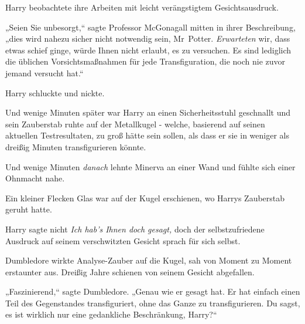 Harry beobachtete ihre Arbeiten mit leicht verängstigtem Gesichtsausdruck.

„Seien Sie unbesorgt,“ sagte Professor McGonagall mitten in ihrer Beschreibung, „dies wird nahezu sicher nicht notwendig sein, Mr~Potter. \emph{Erwarteten} wir, dass etwas schief ginge, würde Ihnen nicht erlaubt, es zu versuchen. Es sind lediglich die üblichen Vorsichtsmaßnahmen für jede Transfiguration, die noch nie zuvor jemand versucht hat.“

Harry schluckte und nickte.

Und wenige Minuten später war Harry an einen Sicherheitsstuhl geschnallt und sein Zauberstab ruhte auf der Metallkugel - welche, basierend auf seinen aktuellen Testresultaten, zu groß hätte sein sollen, als dass er sie in weniger als dreißig Minuten transfigurieren könnte.

Und wenige Minuten \emph{danach} lehnte Minerva an einer Wand und fühlte sich einer Ohnmacht nahe.

Ein kleiner Flecken Glas war auf der Kugel erschienen, wo Harrys Zauberstab geruht hatte.

Harry sagte nicht \emph{Ich hab's Ihnen doch gesagt,} doch der selbstzufriedene Ausdruck auf seinem verschwitzten Gesicht sprach für sich selbst.

Dumbledore wirkte Analyse-Zauber auf die Kugel, sah von Moment zu Moment erstaunter aus. Dreißig Jahre schienen von seinem Gesicht abgefallen.

„Faszinierend,“ sagte Dumbledore. „Genau wie er gesagt hat. Er hat einfach einen Teil des Gegenstandes transfiguriert, ohne das Ganze zu transfigurieren. Du sagst, es ist wirklich nur eine gedankliche Beschränkung, Harry?“

